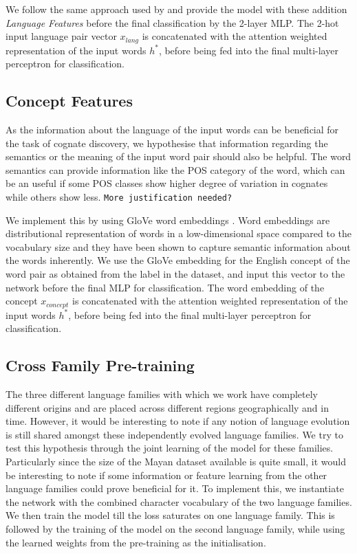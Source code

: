 \documentclass[11pt,letterpaper]{article}
\begin{document}
We follow the same approach used by \citet{rama2016siamese} and provide the model with these addition \textit{Language Features} before the final classification by the 2-layer MLP. The 2-hot input language pair vector $x_{lang}$ is concatenated with the attention weighted representation of the input words $h^{*}$, before being fed into the final multi-layer perceptron for classification.

\subsection{Concept Features}

As the information about the language of the input words can be beneficial for the task of cognate discovery, we hypothesise that information regarding the semantics or the meaning of the input word pair should also be helpful. The word semantics can provide information like the POS category of the word, which can be an useful if some POS classes show higher degree of variation in cognates while others show less. \texttt{More justification needed?}

We implement this by using GloVe word embeddings \citep{pennington2014glove}. Word embeddings are distributional representation of words in a low-dimensional space compared to the vocabulary size and they have been shown to capture semantic information about the words inherently. We use the GloVe embedding for the English concept of the word pair as obtained from the label in the dataset, and input this vector to the network before the final MLP for classification. The word embedding of the concept $x_{concept}$ is concatenated with the attention weighted representation of the input words $h^{*}$, before being fed into the final multi-layer perceptron for classification.

\subsection{Cross Family Pre-training}

The three different language families with which we work have completely different origins and are placed across different regions geographically and in time. However, it would be interesting to note if any notion of language evolution is still shared amongst these independently evolved language families. We try to test this hypothesis through the joint learning of the model for these families. Particularly since the size of the Mayan dataset available is quite small, it would be interesting to note if some information or feature learning from the other language families could prove beneficial for it. To implement this, we instantiate the network with the combined character vocabulary of the two language families. We then train the model till the loss saturates on one language family. This is followed by the training of the model on the second language family, while using the learned weights from the pre-training as the initialisation. 
\end{document}
